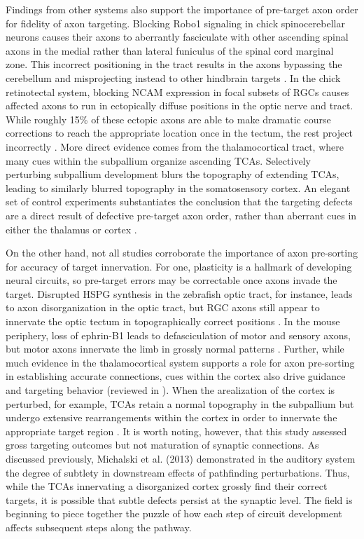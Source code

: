 Findings from other systems also support the importance of pre-target axon order for fidelity of axon targeting.
Blocking Robo1 signaling in chick spinocerebellar neurons causes their axons to aberrantly fasciculate with other ascending spinal axons in the medial rather than lateral funiculus of the spinal cord marginal zone.
This incorrect positioning in the tract results in the axons bypassing the cerebellum and misprojecting instead to other hindbrain targets \cite{sakai2012axon}.
In the chick retinotectal system, blocking NCAM expression in focal subsets of RGCs causes affected axons to run in ectopically diffuse positions in the optic nerve and tract.
While roughly 15\% of these ectopic axons are able to make dramatic course corrections to reach the appropriate location once in the tectum, the rest project incorrectly \cite{thanos1984fiber}.
More direct evidence comes from the thalamocortical tract, where many cues within the subpallium organize ascending TCAs.
Selectively perturbing subpallium development blurs the topography of extending TCAs, leading to similarly blurred topography in the somatosensory cortex.
An elegant set of control experiments substantiates the conclusion that the targeting defects are a direct result of defective pre-target axon order, rather than aberrant cues in either the thalamus or cortex \cite{lokmane2013sensory}.

On the other hand, not all studies corroborate the importance of axon pre-sorting for accuracy of target innervation.
For one, plasticity is a hallmark of developing neural circuits, so pre-target errors may be correctable once axons invade the target.
Disrupted HSPG synthesis in the zebrafish optic tract, for instance, leads to axon disorganization in the optic tract, but RGC axons still appear to innervate the optic tectum in topographically correct positions \cite{lee2004axon}.
In the mouse periphery, loss of ephrin-B1 leads to defasciculation of motor and sensory axons, but motor axons innervate the limb in grossly normal patterns \cite{luxey2013eph}.
Further, while much evidence in the thalamocortical system supports a role for axon pre-sorting in establishing accurate connections, cues within the cortex also drive guidance and targeting behavior (reviewed in \cite{garel2014inputs}).
When the arealization of the cortex is perturbed, for example, TCAs retain a normal topography in the subpallium but undergo extensive rearrangements within the cortex in order to innervate the appropriate target region \cite{shimogori2005fibroblast}.
It is worth noting, however, that this study assessed gross targeting outcomes but not maturation of synaptic connections.
As discussed previously, Michalski et al. (2013) demonstrated in the auditory system the degree of subtlety in downstream effects of pathfinding perturbations.
Thus, while the TCAs innervating a disorganized cortex grossly find their correct targets, it is possible that subtle defects persist at the synaptic level.
The field is beginning to piece together the puzzle of how each step of circuit development affects subsequent steps along the pathway.


